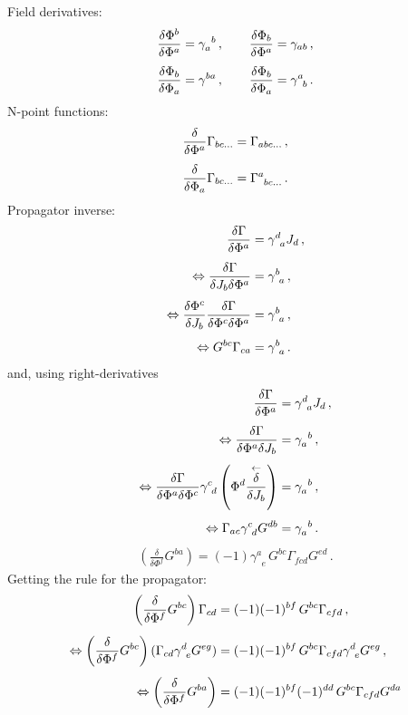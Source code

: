 \documentclass[10pt,prd,nofootinbib,superscriptaddress,twocolumn]{revtex4-2}
\begin{document}
Field derivatives:
%
\begin{align}
	\frac{\delta \Phi^b}{\delta \Phi^a} &= \gamma_a^{\phantom{a}b}
	\,,\qquad
	\frac{\delta \Phi_b}{\delta \Phi^a} = \gamma_{ab}
	\,,\notag\\[1ex]
	\frac{\delta \Phi_b}{\delta \Phi_a} &= \gamma^{ba}
	\,,\qquad
	\frac{\delta \Phi_b}{\delta \Phi_a} = \gamma^{a}_{\phantom{a}b}
	\,.
\end{align}
%
N-point functions:
%
\begin{align}
	\frac{\delta }{\delta \Phi^a} \Gamma_{bc\ldots} = \Gamma_{abc\ldots}
	\,,\notag\\[1ex]
	\frac{\delta }{\delta \Phi_a} \Gamma_{bc\ldots} = \Gamma^{a}_{\phantom{a}bc\ldots}
	\,.
\end{align}
%
Propagator inverse:
%
\begin{align}
	\frac{\delta \Gamma}{\delta \Phi^a} &= \gamma^d_{\phantom{d}a}J_d
	\,,\notag\\[1ex]\Leftrightarrow 
	\frac{\delta \Gamma}{\delta J_b\delta \Phi^a} &= \gamma^b_{\phantom{b}a}
	\,,\notag\\[1ex]\Leftrightarrow 
	\frac{\delta \Phi^c}{\delta J_b}\frac{\delta \Gamma}{\delta \Phi^c\delta \Phi^a} &= \gamma^b_{\phantom{b}a}
	\,,\notag\\[1ex]\Leftrightarrow 
	G^{bc}\Gamma_{ca} &= \gamma^b_{\phantom{b}a}
	\,.
\end{align}
%
and, using right-derivatives
%
\begin{align}
	\frac{\delta \Gamma}{\delta \Phi^a} &= \gamma^d_{\phantom{d}a}J_d
	\,,\notag\\[1ex]\Leftrightarrow 
	\frac{\delta \Gamma}{\delta \Phi^a\delta J_b} &= \gamma_a^{\phantom{a}b}
	\,,\notag\\[1ex]\Leftrightarrow 
	\frac{\delta \Gamma}{\delta \Phi^a\delta \Phi^c}\gamma^c_{\phantom{c}d}\left(\Phi^d\frac{\overset{\leftarrow}{\delta}}{\delta J_b}\right) &= \gamma_a^{\phantom{a}b}
	\,,\notag\\[1ex]\Leftrightarrow 
	\Gamma_{ac}\gamma^c_{\phantom{c}d}G^{db} &= \gamma_a^{\phantom{a}b}
	\,.
\end{align}
%
%
\begin{align}
	\left(\frac{\delta}{\delta \Phi^f}G^{ba}\right)= (-1)\gamma^a_{\phantom{a}e}\, G^{bc}\Gamma_{fcd}G^{ed}
	\,.
\end{align}
%
Getting the rule for the propagator:
%
\begin{align}
	\left(\frac{\delta}{\delta \Phi^f}G^{bc}\right)\Gamma_{cd} 
	&= (-1)(-1)^{bf}\,G^{bc}\Gamma_{cfd}
	\,,\notag\\[1ex]
	\Leftrightarrow\left(\frac{\delta}{\delta \Phi^f}G^{bc}\right)(\Gamma_{cd}\gamma^{d}_{\phantom{d}e}G^{eg}) 
	&= (-1)(-1)^{bf}\,G^{bc}\Gamma_{cfd}\gamma^{d}_{\phantom{d}e}G^{eg}
	\,,\notag\\[1ex]
	\Leftrightarrow\left(\frac{\delta}{\delta \Phi^f}G^{ba}\right) 
	&= (-1)(-1)^{bf}(-1)^{dd}\, G^{bc}\Gamma_{cfd}G^{da}
\end{align}
\end{document}
